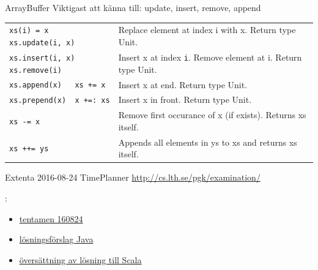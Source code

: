 \begin{Slide}{ArrayBuffer}
Viktigast att känna till: update, insert, remove, append
{\SlideFontTiny

\vspace{2.5em}\begin{tabular}{@{}p{4.2cm}  p{6.5cm}}
\texttt{xs(i) = x \newline xs.update(i, x)} & Replace element at index i with x. \newline Return type Unit.\\   \cline{1-2}

\texttt{xs.insert(i, x)\newline xs.remove(i)} & Insert x at index \texttt{i}. Remove element at i. \newline Return type Unit.\\   \cline{1-2}

\texttt{xs.append(x)~~~xs~+=~x} & Insert x at end.  Return type Unit.\\   \cline{1-2}

\texttt{xs.prepend(x)~~x~+=:~xs} & Insert x in front.  Return type Unit.\\   \cline{1-2}

\texttt{xs -= x} & Remove first occurance of x (if exists). \newline Returns xs itself. \\\cline{1-2}

\texttt{xs ++= ys} & Appends all elements in ys to xs and returns xs itself. \\

\end{tabular}
}
\end{Slide}



\begin{Slide}{Extenta 2016-08-24 TimePlanner}\SlideFontSmall
\url{http://cs.lth.se/pgk/examination/}

\vspace{1em}: 
\begin{itemize}
\item \href{http://fileadmin.cs.lth.se/cs//Education/grundkurs/extentor/160824.pdf}{tentamen 160824} 
\item \href{http://fileadmin.cs.lth.se/cs//Education/grundkurs/extentor/sol-160824.pdf}{lösningsförslag Java} 
\item \href{https://github.com/lunduniversity/introprog/tree/master/compendium/examples/exam/re-impl-java-exams/timeplanner-160824}{översättning av lösning till Scala}
\end{itemize}
\end{Slide}


